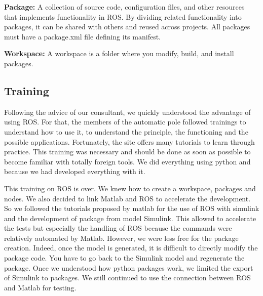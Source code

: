 \bigbreak
\textbf{Package:} A collection of source code, configuration files, and other resources that implements functionality in ROS. By dividing related functionality into packages, it can be shared with others and reused across projects. All packages must have a package.xml file defining its manifest.

\bigbreak
\textbf{Workspace:} A workspace is a folder where you modify, build, and install packages.

\subsection{Training}

\hspace{\parindent} Following the advice of our consultant, we quickly understood the advantage of using ROS. For that, the members of the automatic pole followed trainings to understand how to use it, to understand the principle, the functioning and the possible applications. Fortunately, the site offers many tutorials to learn through practice. This training was necessary and should be done as soon as possible to become familiar with totally foreign tools. We did everything using python and because we had developed everything with it. 

\bigbreak
This training on ROS is over. We knew how to create a workspace, packages and nodes. We also decided to link Matlab and ROS to accelerate the development. So we followed the tutorials proposed by matlab for the use of ROS with simulink and the development of package from model Simulink. This allowed to accelerate the tests but especially the handling of ROS because the commands were relatively automated by Matlab. However, we were less free for the package creation. Indeed, once the model is generated, it is difficult to directly modify the package code. You have to go back to the Simulink model and regenerate the package. Once we understood how python packages work, we limited the export of Simulink to packages. We still continued to use the connection between ROS and Matlab for testing.

